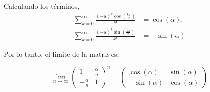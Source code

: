 {	Calculando los t\'erminos,
	\begin{align*}
		\sum_{k=0}^{\infty} \frac{(-\alpha)^k \cos\left(\frac{k\pi}{2}\right)}{k!} & = \cos(\alpha), \\
		\sum_{k=0}^{\infty} \frac{(-\alpha)^k \sin\left(\frac{k\pi}{2}\right)}{k!} & = -\sin(\alpha)
	\end{align*}

	Por lo tanto, el límite de la matriz es,

}


\begin{LnxRptaBox}
	\begin{equation*}
		\lim_{n \to \infty} \left( \begin{array}{cc} 1 & \frac{\alpha}{n} \\ -\frac{\alpha}{n} & 1 \end{array} \right)^n = \begin{pmatrix} \cos(\alpha) & \sin(\alpha) \\ -\sin(\alpha) & \cos(\alpha) \end{pmatrix}
	\end{equation*}
\end{LnxRptaBox}
